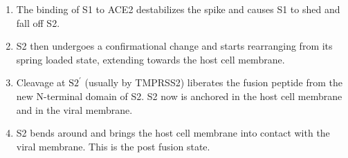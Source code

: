 \documentclass[11pt, oneside]{article}   	%
\begin{document}
\begin{enumerate}
\item The binding of S1 to ACE2 destabilizes the spike and causes S1 to shed and fall off S2.

\item S2 then undergoes a confirmational change and starts rearranging from its spring loaded state, extending
towards the host cell membrane.

\item Cleavage at $\text{S2}^\prime$ (usually by TMPRSS2)  liberates the fusion peptide from the new N-terminal
domain of S2. S2 now is anchored in the host cell membrane and in the
viral membrane.
	
\item S2 bends around and brings the host cell membrane into contact
with the viral membrane. This is the post fusion state.

\end{enumerate}





\end{document}

